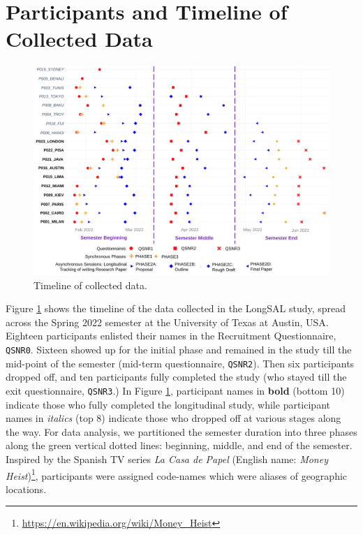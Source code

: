\documentclass[letterpaper, nobind]{templates/ociamthesis}
\begin{document}
\hypertarget{participants-and-timeline-of-collected-data}{%
\section{Participants and Timeline of Collected Data}\label{participants-and-timeline-of-collected-data}}

\begin{figure}

{\centering \includegraphics[width=1\linewidth]{figs/res-timeline-collected-data} 

}

\caption[Timeline of collected data.]{Timeline of collected data.}\label{fig:res-timeline-collected-data}
\end{figure}





Figure \ref{fig:res-timeline-collected-data} shows the timeline of the data collected in the LongSAL study, spread across the Spring 2022 semester at the University of Texas at Austin, USA.
Eighteen participants enlisted their names in the Recruitment Questionnaire, \texttt{QSNR0}.
Sixteen showed up for the initial phase and remained in the study till the mid-point of the semester (mid-term questionnaire, \texttt{QSNR2}).
Then six participants dropped off, and ten participants fully completed the study (who stayed till the exit questionnaire, \texttt{QSNR3}.)
In Figure \ref{fig:res-timeline-collected-data}, participant names in \textbf{bold} (bottom 10) indicate those who fully completed the longitudinal study,
while participant names in \emph{italics} (top 8) indicate those who dropped off at various stages along the way.
For data analysis, we partitioned the semester duration into three phases along the green vertical dotted lines: beginning, middle, and end of the semester.
Inspired by the Spanish TV series \emph{La Casa de Papel} (English name: \emph{Money Heist})\footnote{\url{https://en.wikipedia.org/wiki/Money_Heist}}, participants were assigned code-names which were aliases of geographic locations.
\end{document}
